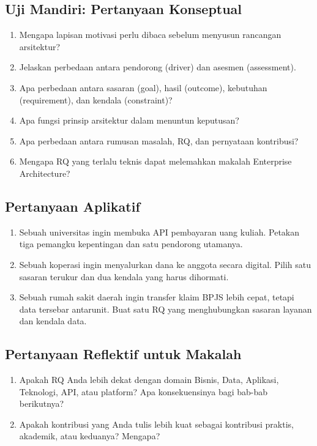 \subsection*{Uji Mandiri: Pertanyaan Konseptual}

\begin{enumerate}
  \item Mengapa lapisan motivasi perlu dibaca sebelum menyusun rancangan
        arsitektur?
  \item Jelaskan perbedaan antara pendorong (driver) dan asesmen (assessment).
  \item Apa perbedaan antara sasaran (goal), hasil (outcome), kebutuhan
        (requirement), dan kendala (constraint)?
  \item Apa fungsi prinsip arsitektur dalam menuntun keputusan?
  \item Apa perbedaan antara rumusan masalah, RQ, dan pernyataan kontribusi?
  \item Mengapa RQ yang terlalu teknis dapat melemahkan makalah Enterprise
        Architecture?
\end{enumerate}

\subsection*{Pertanyaan Aplikatif}

\begin{enumerate}
  \item Sebuah universitas ingin membuka API pembayaran uang kuliah. Petakan
        tiga pemangku kepentingan dan satu pendorong utamanya.
  \item Sebuah koperasi ingin menyalurkan dana ke anggota secara digital. Pilih
        satu sasaran terukur dan dua kendala yang harus dihormati.
  \item Sebuah rumah sakit daerah ingin transfer klaim BPJS lebih cepat, tetapi
        data tersebar antarunit. Buat satu RQ yang menghubungkan sasaran layanan
        dan kendala data.
\end{enumerate}

\subsection*{Pertanyaan Reflektif untuk Makalah}

\begin{enumerate}
  \item Apakah RQ Anda lebih dekat dengan domain Bisnis, Data, Aplikasi,
        Teknologi, API, atau platform? Apa konsekuensinya bagi bab-bab
        berikutnya?
  \item Apakah kontribusi yang Anda tulis lebih kuat sebagai kontribusi
        praktis, akademik, atau keduanya? Mengapa?
\end{enumerate}

